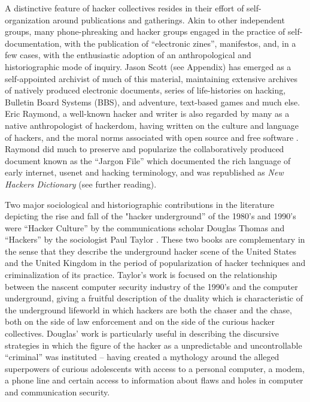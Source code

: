 \documentclass[10pt,letter,oneside]{scrartcl}
\begin{document}

A distinctive feature of hacker collectives resides in their effort of
self-organization around publications and gatherings.  Akin to other independent
groups, many phone-phreaking and hacker groups engaged in the practice of
self-documentation, with the publication of ``electronic zines'', manifestos,
and, in a few cases, with the enthusiastic adoption of an anthropological and
historiographic mode of inquiry.  Jason Scott (see Appendix) has emerged as a
self-appointed archivist of much of this material, maintaining extensive
archives of natively produced electronic documents, series of life-histories on
hacking, Bulletin Board Systems (BBS), and adventure, text-based games and much
else.  Eric Raymond, a well-known hacker and writer is also regarded by many as
a native anthropologist of hackerdom, having written on the culture and language
of hackers, and the moral norms associated with open source and free software
\parencite{raymond_cathedral_1999,raymond_art_2004}.  Raymond did much to preserve
and popularize the collaboratively produced document known as the ``Jargon
File'' which documented the rich language of early internet, usenet and hacking
terminology, and was republished as \emph{New Hackers Dictionary}
\parencite{raymond_new_1993} (see further reading).

Two major sociological and historiographic contributions in the literature
depicting the rise and fall of the "hacker underground'' of the 1980's and
1990's were ``Hacker Culture'' by the communications scholar Douglas Thomas
\cite*{thomas_hacker_2002} and ``Hackers'' by the sociologist Paul Taylor
\cite*{taylor1999hackers}. These two books are complementary in the sense that
they describe the underground hacker scene of the United States and the United
Kingdom in the period of popularization of hacker techniques and criminalization
of its practice.  Taylor's work is focused on the relationship between the
nascent computer security industry of the 1990's and the computer underground,
giving a fruitful description of the duality which is characteristic of the
underground lifeworld in which hackers are both the chaser and the chase, both
on the side of law enforcement and on the side of the curious hacker
collectives.  Douglas' work is particularly useful in describing the discursive
strategies in which the figure of the hacker as a unpredictable and
uncontrollable ``criminal'' was instituted -- having created a mythology around
the alleged superpowers of curious adolescents with access to a personal
computer, a modem, a phone line and certain access to information about flaws
and holes in computer and communication security.
\end{document}
